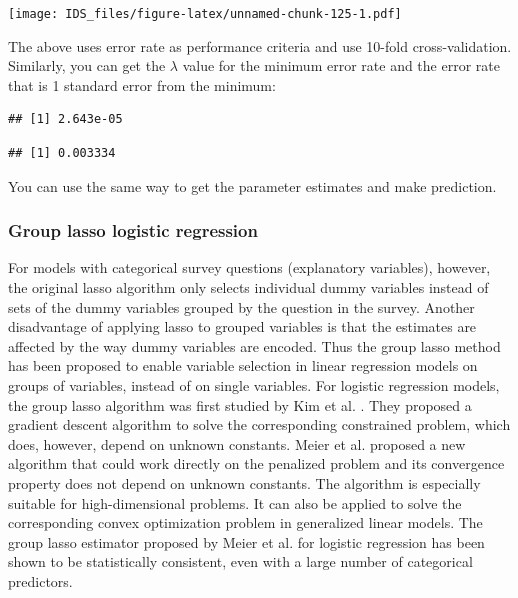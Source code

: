 \documentclass[
  12pt,
]{krantz}
\makeatletter
\newenvironment{Shaded}{\begin{snugshade}}{\end{snugshade}}
\newcommand{\FloatTok}[1]{\textcolor[rgb]{0.06,0.06,0.06}{#1}}
\newcommand{\NormalTok}[1]{#1}
\newcommand{\SpecialCharTok}[1]{\textcolor[rgb]{0,0,0}{#1}}
\newenvironment{kframe}{%
\medskip{}
\setlength{\fboxsep}{.8em}
 \def\at@end@of@kframe{}%
 \ifinner\ifhmode%
  \def\at@end@of@kframe{\end{minipage}}%
  \begin{minipage}{\columnwidth}%
 \fi\fi%
 \def\FrameCommand##1{\hskip\@totalleftmargin \hskip-\fboxsep
 \colorbox{shadecolor}{##1}\hskip-\fboxsep
     \hskip-\linewidth \hskip-\@totalleftmargin \hskip\columnwidth}%
 \MakeFramed {\advance\hsize-\width
   \@totalleftmargin\z@ \linewidth\hsize
   \@setminipage}}%
 {\par\unskip\endMakeFramed%
 \at@end@of@kframe}
\renewenvironment{Shaded}{\begin{kframe}}{\end{kframe}}
\makeatother
\begin{document}
\texttt{[image: IDS\_files/figure-latex/unnamed-chunk-125-1.pdf]}

The above uses error rate as performance criteria and use 10-fold cross-validation. Similarly, you can get the \(\lambda\) value for the minimum error rate and the error rate that is 1 standard error from the minimum:

\begin{Shaded}
\end{Shaded}

\begin{verbatim}
## [1] 2.643e-05
\end{verbatim}

\begin{Shaded}
\end{Shaded}

\begin{verbatim}
## [1] 0.003334
\end{verbatim}

You can use the same way to get the parameter estimates and make prediction.

\hypertarget{group-lasso-logistic-regression}{%
\subsubsection{Group lasso logistic regression}\label{group-lasso-logistic-regression}}

For models with categorical survey questions (explanatory variables), however, the original lasso algorithm only selects individual dummy variables instead of sets of the dummy variables grouped by the question in the survey. Another disadvantage of applying lasso to grouped variables is that the estimates are affected by the way dummy variables are encoded. Thus the group lasso \citep{Yuan2007} method has been proposed to enable variable selection in linear regression models on groups of variables, instead of on single variables. For logistic regression models, the group lasso algorithm was first studied by Kim et al. \citep{Kim2006}. They proposed a gradient descent algorithm to solve the corresponding constrained problem, which does, however, depend on unknown constants. Meier et al. \citep{Meier2008} proposed a new algorithm that could work directly on the penalized problem and its convergence property does not depend on unknown constants. The algorithm is especially suitable for high-dimensional problems. It can also be applied to solve the corresponding convex optimization problem in generalized linear models. The group lasso estimator proposed by Meier et al. \citep{Meier2008} for logistic regression has been shown to be statistically consistent, even with a large number of categorical predictors.
\end{document}
